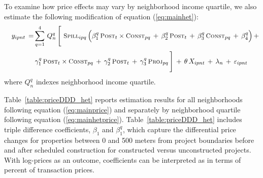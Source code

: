 \documentclass[12pt]{article}
\begin{document}
To examine how price effects may vary by neighborhood income quartile, we also estimate the following modification of equation (\ref{eq:mainhet}):
\begin{align}\label{eq:mainhetprice}
\begin{split}
\quad y_{ipnt} \, =& \sum_{q=1}^{4} \, Q_{n}^{q} \, \Bigg[ \,\, \textsc{\small Spill}_{ipq} \, \Big( \beta_1^q \, \textsc{\small Post}_{t}\times\textsc{\small Const}_{pq} \, + \, \beta_2^q \, \textsc{\small Post}_{t} \, + \, \beta_3^q \, \textsc{\small Const}_{pq} \, +\, \beta_4^q \Big) \, + \\[.2em]
& \, \gamma_1^q \,  \textsc{\small Post}_{t}\times\textsc{\small Const}_{pq} \, + \, \gamma_2^q \,\textsc{\small Post}_{t} \, + \, \gamma_3^q \,  \textsc{\small Proj}_{pq} \, \Bigg] \, + \, \theta \, X_{ipnt} \, + \, \lambda_n \, + \, \varepsilon_{ipnt} \quad 
\end{split}
\end{align}
\noindent where $Q_n^q$ indexes neighborhood income quartile.  

Table~\ref{table:priceDDD_het} reports estimation results for all neighborhoods following equation (\ref{eq:mainprice}) and separately by neighborhood quartile following equation (\ref{eq:mainhetprice}).  Table~\ref{table:priceDDD_het} includes triple difference coefficients, $\beta_1$ and $\beta_1^q$, which capture the differential price changes for properties between 0 and 500 meters from project boundaries before and after scheduled construction for constructed versus unconstructed projects.  With log-prices as an outcome, coefficients can be interpreted as in terms of percent of transaction prices.
\end{document}
